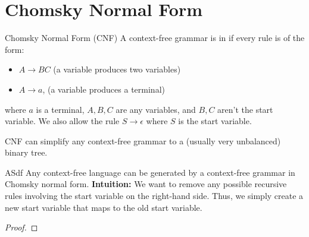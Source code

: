 
\section{Chomsky Normal Form}

\begin{dfnbox}{Chomsky Normal Form (CNF)}{}
    A context-free grammar is in  if every rule is of the form:
    \begin{itemize}
        \item $A \to BC$ (a variable produces two variables)
        \item $A \to a$, (a variable produces a terminal)
    \end{itemize}
    where $a$ is a terminal, $A,B,C$ are any variables, and $B,C$ aren't the start variable. We also allow the rule $S \to \epsilon$ where $S$ is the start variable.
\end{dfnbox}

CNF can simplify any context-free grammar to a (usually very unbalanced) binary tree.

\begin{thmbox}{ASdf}{}
    Any context-free language can be generated by a context-free grammar in Chomsky normal form.
    \tcblower
    \textbf{Intuition:} We want to remove any possible recursive rules involving the start variable on the right-hand side. Thus, we simply create a new start variable that maps to the old start variable.

    \begin{proof}

    \end{proof}
\end{thmbox}

